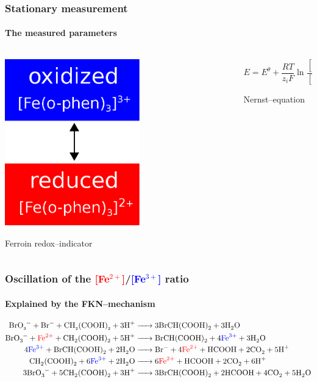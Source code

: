 \documentclass{beamer}
\begin{document}
\begin{frame}
\frametitle{Stationary measurement}
\framesubtitle{The measured parameters}
\begin{columns}[T] %
\begin{column}{.48\textwidth}

\centering
\includegraphics[width=0.6\textwidth]{ferroin.eps}

Ferroin redox--indicator

\end{column}%
\hfill%
\begin{column}{.48\textwidth}
\centering


\begin{equation*}
        E=E^\theta + \frac{RT}{z_iF} \ln \frac{[Fe^{3+}]}{[Fe^{2+}]}
\end{equation*}

Nernst--equation
\end{column}%
\end{columns}
\end{frame}

\begin{frame}
\frametitle{Oscillation of the \textcolor{red}{[Fe$^{2+}$]}/\textcolor{blue}{[Fe$^{3+}$]} ratio}
\framesubtitle{Explained by the FKN--mechanism}
\tiny
\begin{align}
\tiny
\ce {BrO3^- + Br- + CH2(COOH)2 + 3 H+ &-> 3 BrCH(COOH)2 + 3 H2O}\\
\ce {BrO3^- + \textcolor{red}{\ce {Fe^2+}} + CH2(COOH)2 + 5 H+ &-> BrCH(COOH)2 + 4 \textcolor{blue}{\ce {Fe^3+}} + 3 H2O}\\
\ce {4 \textcolor{blue}{\ce {Fe^3+}} + BrCH(COOH)2 + 2 H2O &-> Br- + 4 \textcolor{red}{\ce {Fe^2+}} + HCOOH + 2 CO2 + 5 H+}\\
\ce {CH2(COOH)2 + 6 \textcolor{blue}{\ce {Fe^3+}} + 2 H2O &-> 6 \textcolor{red}{\ce {Fe^2+}} + HCOOH + 2 CO2 + 6 H+}\\
\ce {3 BrO3^- + 5 CH2(COOH)2 + 3 H+ &-> 3 BrCH(COOH)2 + 2 HCOOH + 4 CO2 + 5 H2O}
\large
\end{align}
\large
\end{frame}
\end{document}

